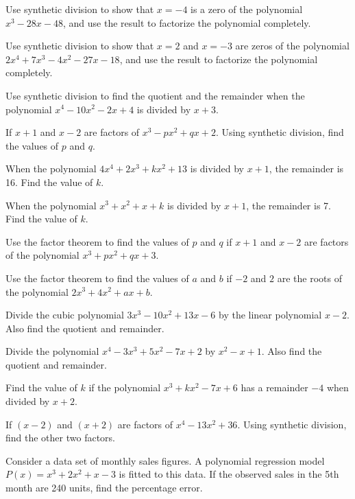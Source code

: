\documentclass[11pt,a4paper]{article}
\begin{document}
\begin{longlist}
\item Use synthetic division to show that $x=-4$ is a zero of the polynomial $x^3-28x-48$, and use the result to factorize the polynomial completely.

\item Use synthetic division to show that $x=2$ and $x=-3$ are zeros of the polynomial $2x^4+7x^3-4x^2-27x-18$, and use the result to factorize the polynomial completely.

\item Use synthetic division to find the quotient and the remainder when the polynomial $x^4-10x^2-2x+4$ is divided by $x+3$.

\item If $x+1$ and $x-2$ are factors of $x^3-px^2+qx+2$. Using synthetic division, find the values of $p$ and $q$.

\item When the polynomial $4x^4+2x^3+kx^2+13$ is divided by $x+1$, the remainder is 16. Find the value of $k$.

\item When the polynomial $x^3+x^2+x+k$ is divided by $x+1$, the remainder is 7. Find the value of $k$.

\item Use the factor theorem to find the values of $p$ and $q$ if $x+1$ and $x-2$ are factors of the polynomial $x^3+px^2+qx+3$.

\item Use the factor theorem to find the values of $a$ and $b$ if $-2$ and $2$ are the roots of the polynomial $2x^3+4x^2+ax+b$.

\item Divide the cubic polynomial $3x^3-10x^2+13x-6$ by the linear polynomial $x-2$. Also find the quotient and remainder.

\item Divide the polynomial $x^4-3x^3+5x^2-7x+2$ by $x^2-x+1$. Also find the quotient and remainder.

\item Find the value of $k$ if the polynomial $x^3+kx^2-7x+6$ has a remainder $-4$ when divided by $x+2$.

\item If $(x-2)$ and $(x+2)$ are factors of $x^4-13x^2+36$. Using synthetic division, find the other two factors.

\item Consider a data set of monthly sales figures. A polynomial regression model $P(x)=x^3+2x^2+x-3$ is fitted to this data. If the observed sales in the 5th month are 240 units, find the percentage error.


\end{longlist}
\end{document}
